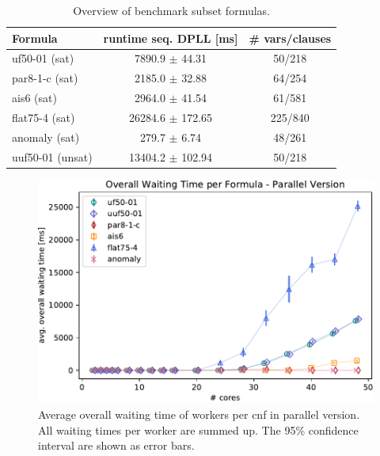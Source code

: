 \documentclass[letterpaper]{article}
\begin{document}
\begin{table}
    \centering
    \begin{tabular}{|l|c|c|}
        \hline
        Formula & runtime seq. DPLL [ms] & \# vars/clauses \\
        \hline
        \hline
        uf50-01 (sat) & 7890.9 $\pm$ 44.31 & 50/218\\
        \hline
        par8-1-c (sat) & 2185.0 $\pm$ 32.88 & 64/254\\
        \hline
        ais6 (sat) &  2964.0 $\pm$ 41.54 & 61/581\\
        \hline
        flat75-4 (sat) & 26284.6 $\pm$ 172.65 & 225/840\\
        \hline
        anomaly (sat) & 279.7 $\pm$ 6.74 & 48/261\\
        \hline
        uuf50-01 (unsat) & 13404.2 $\pm$ 102.94 & 50/218\\
        \hline
    \end{tabular}
    \caption{Overview of benchmark subset formulas.}
    \label{tab:cnfs_parallel}
\end{table}

\begin{figure}
    \centering
    \includegraphics[width=\columnwidth]{figures/waiting_parallel_subset_dpll_scaling_tar.pdf}
    \caption{Average overall waiting time of workers per cnf in parallel version.
    All waiting times per worker are summed up.
    The 95\% confidence interval are shown as error bars.}
    \label{fig:dpll_parallel_waiting}
\end{figure}
\end{document}
